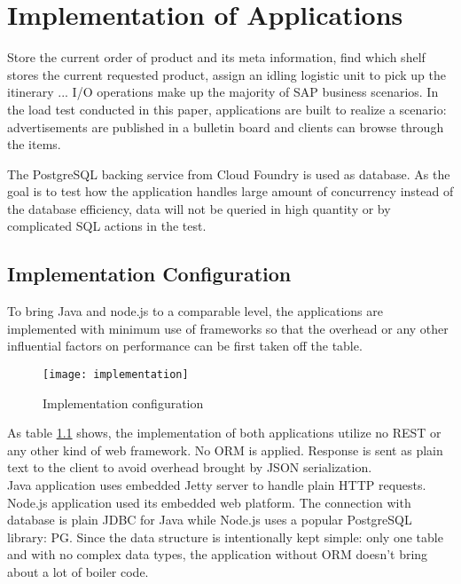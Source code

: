 \chapter{Implementation of Applications}
Store the current order of product and its meta information, find which shelf stores the current requested product, assign an idling logistic unit to pick up the itinerary ... I/O operations make up the majority of SAP business scenarios. 
 In the load test conducted in this paper, applications are built to realize a scenario: advertisements are published in a bulletin board and clients can browse through the items. 

The PostgreSQL backing service from Cloud Foundry is used as database. As the goal is to test how the application handles large amount of concurrency instead of the database efficiency, data will not be queried in high quantity or by complicated SQL actions in the test. 

\section{Implementation Configuration}
To bring Java and node.js to a comparable level, the applications are implemented with minimum use of frameworks so that the overhead or any other influential factors on performance can be first taken off the table.

 \begin{figure}[h]
 	\centering
 	\texttt{[image: implementation]}
 	\caption{Implementation configuration}
 	\label{implementation}
 \end{figure}

As table \ref{implementation} shows,  the implementation of both applications utilize no REST or any other kind of web framework. No ORM is applied. Response is sent as plain text to the client to avoid overhead brought by JSON serialization. \\
Java application uses embedded Jetty server to handle plain HTTP requests. Node.js application used its embedded web platform. The connection with database is plain JDBC for Java while Node.js uses a popular PostgreSQL library: PG. Since the data structure is intentionally kept simple: only one table and with no complex data types, the application without ORM doesn't bring about a lot of boiler code.  \\

